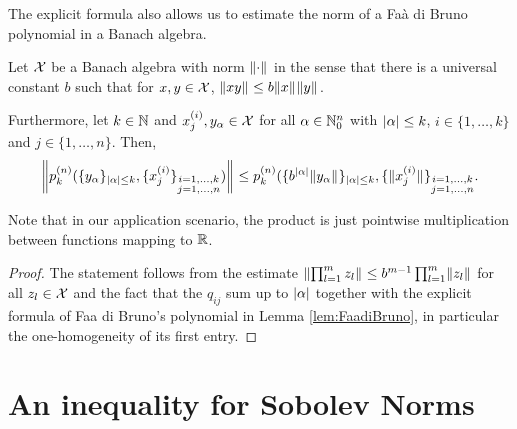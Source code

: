 The explicit formula also allows us to estimate the norm of a Faà di Bruno polynomial in a Banach algebra.
\begin{lemma}
	\label{lemma:estimateFaaDiBrunoBanachAlgebra}
	Let $\mathcal{X}$ be a Banach algebra with norm $\norm{\cdot}$ in the sense that there is a universal constant $b$ such that for $x,y \in \mathcal{X}$, $\norm{xy} \le b \norm{x}\norm{y}$.    
	
	Furthermore, let $k \in \mathbb{N}$ and $x_j^{(i)},y_\alpha \in \mathcal{X}$ for all $\alpha \in \mathbb{N}_0^n$ with $\lvert\alpha\rvert \le k$, $i \in \{1,\ldots,k\}$ and $j \in \{1,\ldots,n\}$.    
	Then,
	\[
	\norm*{p_k^{(n)}(\{y_\alpha\}_{\abs{\alpha}\le k}, \{x_j^{(i)}\}_{\substack{i = 1, \ldots, k\\j =1, \ldots, n}})}
	\le p_k^{(n)}(\{b^{\abs{\alpha}}\norm{y_\alpha}\}_{\abs{\alpha}\le k}, \{\norm{x_j^{(i)}}\}_{\substack{i = 1, \ldots, k\\j =1, \ldots, n}}.
	\]
\end{lemma}
Note that in our application scenario, the product is just pointwise multiplication between functions mapping to $\mathbb{R}$.
\begin{proof}
	The statement follows from the estimate $\norm{\prod_{l=1}^m z_l} \le b^{m-1} \prod_{l=1}^m \norm{z_l}$ for all $z_l \in \mathcal{X}$ and the fact that the $q_{ij}$ sum up to $\lvert\alpha\rvert$ together with the explicit formula
    of Faa di Bruno's polynomial in Lemma \ref{lem:FaadiBruno}, in particular the one-homogeneity of its first entry.
\end{proof}


\section{An inequality for Sobolev Norms}

